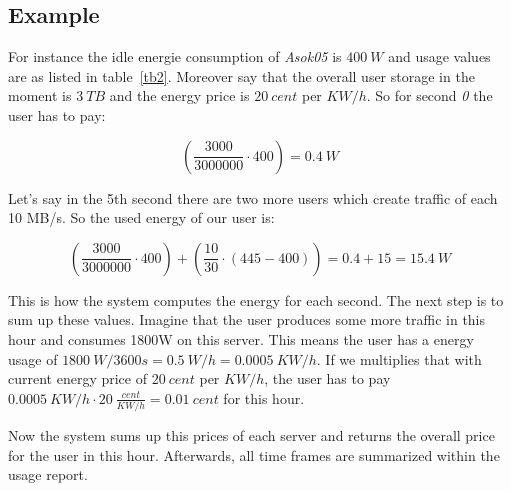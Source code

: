   \subsection{Example}
    For instance the idle energie consumption of \textit{Asok05} is $400\ W$ and usage values are as listed in table~\ref{tb2}. Moreover say that the overall user storage in the moment is $3\ TB$ and the energy price is $20\ cent$ per $KW/h$. So for second \textit{0} the user has to pay:
    
     $$(\frac{3000}{3000000} \cdot 400) = 0.4\ W $$
    
    Let's say in the 5th second there are two more users which create traffic of each 10 MB/s. So the used energy of our user is:
    
     $$(\frac{3000}{3000000} \cdot 400) + (\frac{10}{30} \cdot (445 - 400)) = 0.4 + 15 = 15.4\ W $$
           
  	This is how the system computes the energy for each second. The next step is to sum up these values. Imagine that the user produces some more traffic in this hour and consumes 1800W on this server. This means the user has a energy usage of $1800\ W / 3600s = 0.5\ W/h = 0.0005 \ KW/h$. If we multiplies that with current energy price of $20\ cent$ per $KW/h$, the user has to pay $ 0.0005\ KW/h \cdot 20\ \frac{cent}{KW/h} = 0.01\ cent$ for this hour.
  	
  	Now the system sums up this prices of each server and returns the overall price for the user in this hour. Afterwards, all time frames are summarized within the usage report.
